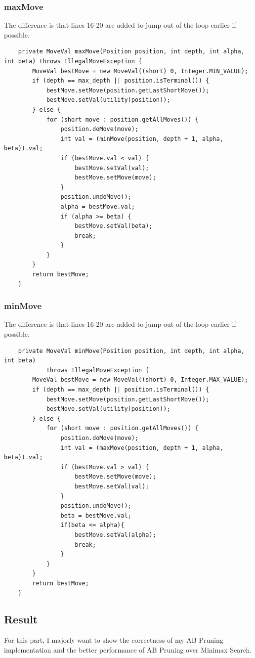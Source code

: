 \documentclass{article}
\begin{document}
\subsubsection{maxMove}
The difference is that lines 16-20 are added to jump out of the loop earlier if possible.
\begin{lstlisting}
	private MoveVal maxMove(Position position, int depth, int alpha, int beta) throws IllegalMoveException {
		MoveVal bestMove = new MoveVal((short) 0, Integer.MIN_VALUE);
		if (depth == max_depth || position.isTerminal()) {
			bestMove.setMove(position.getLastShortMove());
			bestMove.setVal(utility(position));
		} else {
			for (short move : position.getAllMoves()) {
				position.doMove(move);
				int val = (minMove(position, depth + 1, alpha, beta)).val;
				if (bestMove.val < val) {
					bestMove.setVal(val);
					bestMove.setMove(move);
				}
				position.undoMove();
				alpha = bestMove.val;
				if (alpha >= beta) {
					bestMove.setVal(beta);
					break;
				}
			}
		}
		return bestMove;
	}
\end{lstlisting}

\subsubsection{minMove}
The difference is that lines 16-20 are added to jump out of the loop earlier if possible.
\begin{lstlisting}
	private MoveVal minMove(Position position, int depth, int alpha, int beta) 
			throws IllegalMoveException {
		MoveVal bestMove = new MoveVal((short) 0, Integer.MAX_VALUE);
		if (depth == max_depth || position.isTerminal()) {
			bestMove.setMove(position.getLastShortMove());
			bestMove.setVal(utility(position));
		} else {
			for (short move : position.getAllMoves()) {
				position.doMove(move);
				int val = (maxMove(position, depth + 1, alpha, beta)).val;
				if (bestMove.val > val) {
					bestMove.setMove(move);
					bestMove.setVal(val);
				}
				position.undoMove();
				beta = bestMove.val;
				if(beta <= alpha){
					bestMove.setVal(alpha);
					break;
				}
			}
		}
		return bestMove;
	}
\end{lstlisting}

\subsection{Result}
For this part, I majorly want to show the correctness of my AB Pruning implementation and the better performance of AB Pruning over Minimax Search.
\end{document}
